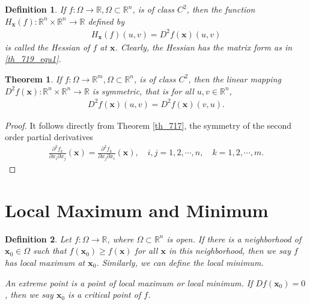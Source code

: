 \documentclass[11pt]{book}
\newtheorem{definition}{Definition}[chapter]
\newtheorem{theorem}{Theorem}[chapter]
\theoremstyle{definition}
\numberwithin{equation}{chapter}
\begin{document}
\medskip

\begin{definition}
If $f: \Omega \to \mathbb{R}, \Omega \subset \mathbb{R}^n$, is of class $C^2$, then the function $H_{\mathbf{x}}(f): \mathbb{R}^n \times \mathbb{R}^n \to \mathbb{R}$ defined by
\begin{align*}
    H_{\mathbf{x}}(f)(u,v) = D^2f(\mathbf{x})(u,v)
\end{align*}
is called the Hessian of $f$ at $\mathbf{x}$. Clearly, the Hessian has the matrix form as in \eqref{th_719_equ1}.
\end{definition}

\medskip

\begin{theorem}
If $f: \Omega \to \mathbb{R}^m, \Omega \subset \mathbb{R}^n$, is of class $C^2$, then the linear mapping $D^2f(\mathbf{x}): \mathbb{R}^n \times \mathbb{R}^n \to \mathbb{R}$ is symmetric, that is for all $u, v \in \mathbb{R}^n$,
\begin{align*}
    D^2f(\mathbf{x})(u,v) = D^2f(\mathbf{x})(v,u).
\end{align*}
\end{theorem}
\begin{proof}
It follows directly from Theorem \ref{th_717}, the symmetry of the second order partial derivatives
\begin{align*}
    \frac{\partial^2 f_k}{\partial x_i \partial x_j}(\mathbf{x}) = \frac{\partial^2 f_k}{\partial x_j \partial x_i}(\mathbf{x}), \quad i,j = 1,2,\cdots,n, \quad k = 1, 2,\cdots,m.
\end{align*}
\end{proof}

\medskip



\section{Local Maximum and Minimum}

\begin{definition}
Let $f: \Omega \to \mathbb{R}$, where $\Omega \subset \mathbb{R}^n$ is open. If there is a neighborhood of $\mathbf{x}_0 \in \Omega$ such that $f(\mathbf{x}_0) \geq f(\mathbf{x})$ for all $\mathbf{x}$ in this neighborhood, then we say  $f$ has local maximum at $\mathbf{x}_0$. Similarly, we can define the local minimum.

An extreme point is a point of local maximum or local minimum. If $Df(\mathbf{x}_0) = 0$, then we say $\mathbf{x}_0$ is a critical point of $f$.
\end{definition}
\end{document}
